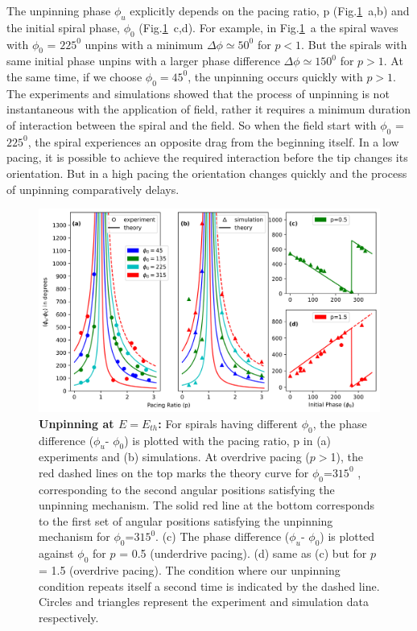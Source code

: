 \documentclass[%
 preprint,
 amsmath,amssymb,
 aps,
]{revtex4-2}
\begin{document}
The unpinning phase $\phi_{u}$ explicitly depends on the pacing ratio, p (Fig.\ref{fig:unpinning_Eth}~a,b) and the initial spiral phase, $\phi_{0}$ (Fig.\ref{fig:unpinning_Eth}~c,d). For example, in Fig.\ref{fig:unpinning_Eth}~a the spiral waves with $\phi_{0}$ = $225^0$ unpins with a minimum $\Delta\phi \simeq 50^0$ for $p<1$. %
But the spirals with same initial phase unpins with a larger phase difference $\Delta\phi \simeq 150^0$ for $p>1$. At the same time, if we choose $\phi_{0} = 45^0$, the unpinning occurs quickly with $p>1$. 
The experiments and simulations showed that the process of unpinning is not instantaneous with the application of field, rather it requires a minimum duration of interaction between the spiral and the field. So when the field start with $\phi_{0}$ = $225^0$, the spiral experiences an opposite drag from the beginning itself. In a low pacing, it is possible to achieve the required interaction before the tip changes its orientation. But in a high pacing the orientation changes quickly and the process of unpinning comparatively delays. 

\begin{figure}[H]
    \centering
    \includegraphics[scale=0.7]{Fig2.png}
    \caption{\textbf{Unpinning at $E = E_{th}$:} For spirals having different ${\phi}_0$,  the phase difference (${\phi}_u$- ${\phi}_0$) is plotted with the pacing ratio, p in (a) experiments and (b) simulations. At overdrive pacing ($p>$1), the red dashed lines on the top marks the theory curve for ${\phi}_0$=$315^0$ , corresponding to the second angular positions satisfying the unpinning mechanism. The solid red line at the bottom corresponds to the first set of angular positions satisfying the unpinning mechanism for ${\phi}_0$=$315^0$.
    (c) The phase difference (${\phi}_u$- ${\phi}_0$) is plotted against ${\phi}_0$ for $p$ = 0.5 (underdrive pacing). (d) same as (c) but for $p$ = 1.5 (overdrive pacing). The condition where our unpinning condition repeats itself a second time is indicated by the dashed line. Circles and triangles represent the experiment and simulation data respectively.  
    }
    \label{fig:unpinning_Eth}
\end{figure}
\end{document}
